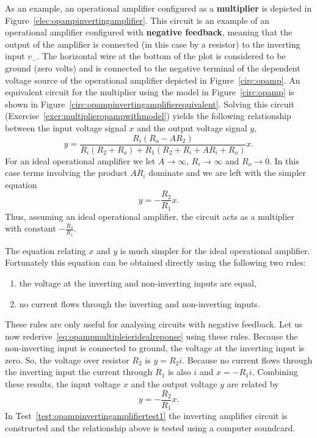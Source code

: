 \documentclass[11pt,a4paper]{book}
\theoremstyle{plain}
\numberwithin{equation}{section}
\newcommand{\term}{\textbf}
\newcounter{test}
\begin{document}
As an example, an operational amplifier configured as a \term{multiplier} is depicted in Figure~\ref{elec:opampinvertingamplifier}.  This circuit is an example of an operational amplifier configured with \term{negative feedback}, meaning that the output of the amplifier is connected (in this case by a resistor) to the inverting input $v_{-}$.  The horizontal wire at the bottom of the plot is considered to be ground (zero volts) and is connected to the negative terminal of the dependent voltage source of the operational amplifier depicted in Figure~\ref{circ:opamp}.  An equivalent circuit for the multiplier using the model in Figure~\ref{circ:opamp} is shown in Figure~\ref{circ:opampinvertingamplifierequivalent}.  Solving this circuit (Exercise~\ref{exer:multiplieropampwithmodel}) yields the following relationship between the input voltage signal $x$ and the output voltage signal $y$,
\begin{equation} \label{eq:intertingopampmodel}
y = \frac{R_i (R_o - A R_2) }{R_i (R_2+R_o)+R_1 (R_2+R_i + A R_i+R_o)}x.
\end{equation}
For an ideal operational amplifier we let $A\to\infty$, $R_i\to\infty$ and $R_o\to 0$.  In this case terms involving the product $A R_i$ dominate and we are left with the simpler equation
\begin{equation}\label{eq:opampmultipleieridealreponse}
y = -\frac{R_2}{R_1} x.
\end{equation}
Thus, assuming an ideal operational amplifier, the circuit acts as a multiplier with constant $-\tfrac{R_2}{R_1}$.  

The equation relating $x$ and $y$ is much simpler for the ideal operational amplifier.  Fortunately this equation can be obtained directly using the following two rules:
\begin{enumerate}
\item the voltage at the inverting and non-inverting inputs are equal,
\item no current flows through the inverting and non-inverting inputs. 
\end{enumerate}
These rules are only useful for analysing circuits with negative feedback.  Let us now rederive~\eqref{eq:opampmultipleieridealreponse} using these rules.  Because the non-inverting input is connected to ground, the voltage at the inverting input is zero.  So, the voltage over resistor $R_2$ is $y = R_2 i$.  Because no current flows through the inverting input the current through $R_1$ is also $i$ and $x = -R_1i$.  Combining these results, the input voltage $x$ and the output voltage $y$ are related by
\[
y = -\frac{R_2}{R_1} x.
\]
In Test~\ref{test:opampinvertingamplifiertest1} the inverting amplifier circuit is constructed and the relationship above is tested using a computer soundcard.
\end{document}
